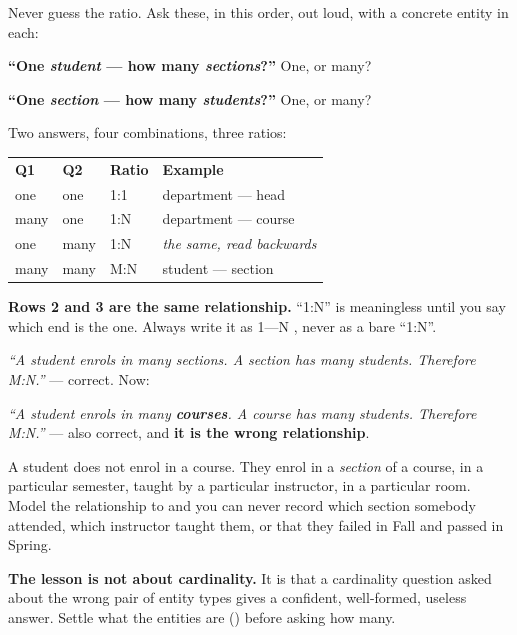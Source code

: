 \begin{conceptbox}
Never guess the ratio. Ask these, in this order, out loud, with a concrete
entity in each:

\begin{tight}
  \item \textbf{``One \emph{student} --- how many \emph{sections}?''}
        \quad One, or many?
  \item \textbf{``One \emph{section} --- how many \emph{students}?''}
        \quad One, or many?
\end{tight}

\smallskip
Two answers, four combinations, three ratios:

\medskip
\begin{tabular}{@{}L{3.3cm}L{3.3cm}L{3.0cm}L{4.1cm}@{}}
\textbf{Q1} & \textbf{Q2} & \textbf{Ratio} & \textbf{Example} \\
one  & one  & 1:1 & department --- head \\
many & one  & 1:N & department --- course \\
one  & many & 1:N & \emph{the same, read backwards} \\
many & many & M:N & student --- section \\
\end{tabular}

\smallskip
\textbf{Rows 2 and 3 are the same relationship.} ``1:N'' is meaningless until
you say which end is the one. Always write it as 
1---N , never as a bare ``1:N''.
\end{conceptbox}

\begin{examplebox}
\emph{``A student enrols in many sections. A section has many students.
Therefore M:N.''} --- correct. Now:

\medskip
\emph{``A student enrols in many \textbf{courses}. A course has many students.
Therefore M:N.''} --- also correct, and \textbf{it is the wrong relationship}.

\smallskip
A student does not enrol in a course. They enrol in a \emph{section} of a
course, in a particular semester, taught by a particular instructor, in a
particular room. Model the relationship to  and you can never
record which section somebody attended, which instructor taught them, or that
they failed in Fall and passed in Spring.

\smallskip
\textbf{The lesson is not about cardinality.} It is that a cardinality
question asked about the wrong pair of entity types gives a confident,
well-formed, useless answer. Settle what the entities are
() before asking how many.
\end{examplebox}

